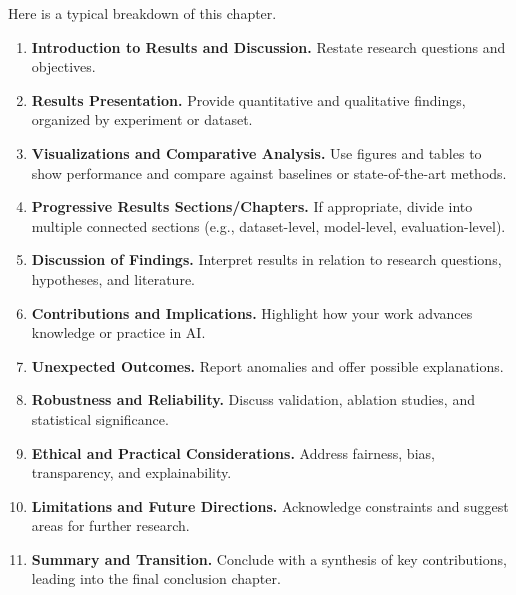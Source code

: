 \documentclass[PCOM,Thesis,Review]{mpThesis}
\newcommand{\Hd}[1]{{\color{SteelBlue}\bf#1.}}
\begin{document}
\begin{MainMatter}
\begin{Remark}
Here is a typical breakdown of this chapter.
\begin{enumerate}
\item \Hd{Introduction to Results and Discussion}
Restate research questions and objectives.

\item \Hd{Results Presentation}
Provide quantitative and qualitative findings, organized by experiment or dataset.

\item \Hd{Visualizations and Comparative Analysis}
Use figures and tables to show performance and compare against baselines or state-of-the-art methods.

\item \Hd{Progressive Results Sections/Chapters}
If appropriate, divide into multiple connected sections (e.g., dataset-level, model-level, evaluation-level).

\item \Hd{Discussion of Findings}
Interpret results in relation to research questions, hypotheses, and literature.

\item \Hd{Contributions and Implications}
Highlight how your work advances knowledge or practice in AI.

\item \Hd{Unexpected Outcomes}
Report anomalies and offer possible explanations.

\item \Hd{Robustness and Reliability}
Discuss validation, ablation studies, and statistical significance.

\item \Hd{Ethical and Practical Considerations}
Address fairness, bias, transparency, and explainability.

\item \Hd{Limitations and Future Directions}
Acknowledge constraints and suggest areas for further research.

\item \Hd{Summary and Transition}
Conclude with a synthesis of key contributions, leading into the final conclusion chapter.
\end{enumerate}


\end{Remark}
\end{MainMatter}
\end{document}
